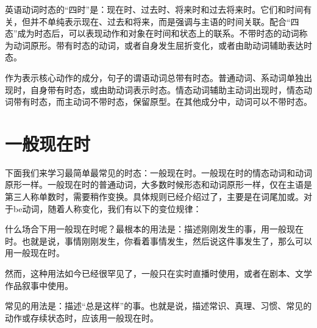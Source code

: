 \documentclass[10.5pt, a4paper]{ctexbook} %
\begin{document}
英语动词时态的“四时”是：现在时、过去时、将来时和过去将来时。它们和时间有关，但并不单纯表示现在、过去和将来，而是强调与主语的时间关联。配合“四态”成为时态后，可以表现动作和对象在时间和状态上的联系。不带时态的动词称为动词原形。带有时态的动词，或者自身发生屈折变化，或者由助动词辅助表达时态。

作为表示核心动作的成分，句子的谓语动词总带有时态。普通动词、系动词单独出现时，自身带有时态，或由助动词表示时态。情态动词辅助主动词出现时，情态动词带有时态，而主动词不带时态，保留原型。在其他成分中，动词可以不带时态。

\section{一般现在时}

下面我们来学习最简单最常见的时态：一般现在时。一般现在时的情态动词和动词原形一样。一般现在时的普通动词，大多数时候形态和动词原形一样，仅在主语是第三人称单数时，需要稍作变换。具体规则已经介绍过了，主要是在词尾加或。对于be动词，随着人称变化，我们有以下的变位规律：

\begin{liju}
\end{liju}

什么场合下用一般现在时呢？最根本的用法是：描述刚刚发生的事，用一般现在时。也就是说，事情刚刚发生，你看着事情发生，然后说这件事发生了，那么可以用一般现在时。

\begin{liju}
\end{liju}

然而，这种用法如今已经很罕见了，一般只在实时直播时使用，或者在剧本、文学作品叙事中使用。

常见的用法是：描述“总是这样”的事。也就是说，描述常识、真理、习惯、常见的动作或存续状态时，应该用一般现在时。

\begin{liju}
\end{liju}
\end{document}
